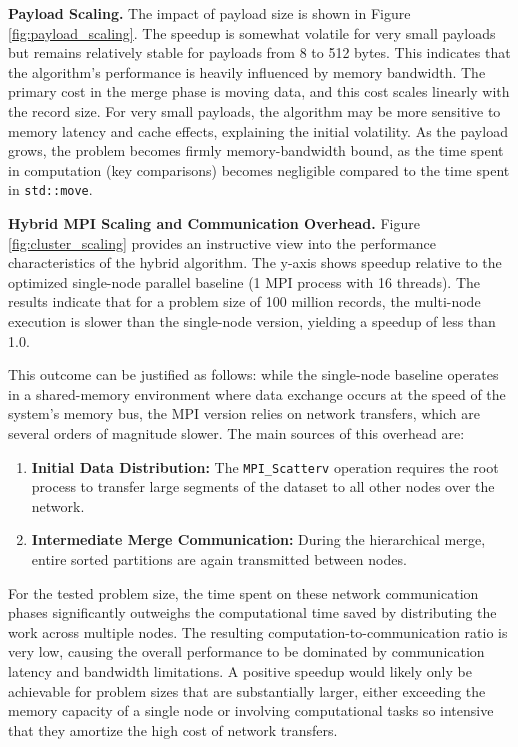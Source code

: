 \documentclass[10pt]{article}
\newcommand{\code}[1]{\texttt{#1}}
\begin{document}
\textbf{Payload Scaling.} The impact of payload size is shown in Figure \ref{fig:payload_scaling}. The speedup is somewhat volatile for very small payloads but remains relatively stable for payloads from 8 to 512 bytes. This indicates that the algorithm's performance is heavily influenced by memory bandwidth. The primary cost in the merge phase is moving data, and this cost scales linearly with the record size. For very small payloads, the algorithm may be more sensitive to memory latency and cache effects, explaining the initial volatility. As the payload grows, the problem becomes firmly memory-bandwidth bound, as the time spent in computation (key comparisons) becomes negligible compared to the time spent in \code{std::move}.

\textbf{Hybrid MPI Scaling and Communication Overhead.} Figure \ref{fig:cluster_scaling} provides an instructive view into the performance characteristics of the hybrid algorithm. The y-axis shows speedup relative to the optimized single-node parallel baseline (1 MPI process with 16 threads). The results indicate that for a problem size of 100 million records, the multi-node execution is slower than the single-node version, yielding a speedup of less than 1.0.

This outcome can be justified as follows: while the single-node baseline operates in a shared-memory environment where data exchange occurs at the speed of the system's memory bus, the MPI version relies on network transfers, which are several orders of magnitude slower. The main sources of this overhead are:
\begin{enumerate}
    \item \textbf{Initial Data Distribution:} The \code{MPI\_Scatterv} operation requires the root process to transfer large segments of the dataset to all other nodes over the network.
    \item \textbf{Intermediate Merge Communication:} During the hierarchical merge, entire sorted partitions are again transmitted between nodes.
\end{enumerate}
For the tested problem size, the time spent on these network communication phases significantly outweighs the computational time saved by distributing the work across multiple nodes. The resulting computation-to-communication ratio is very low, causing the overall performance to be dominated by communication latency and bandwidth limitations. A positive speedup would likely only be achievable for problem sizes that are substantially larger, either exceeding the memory capacity of a single node or involving computational tasks so intensive that they amortize the high cost of network transfers.
\end{document}

